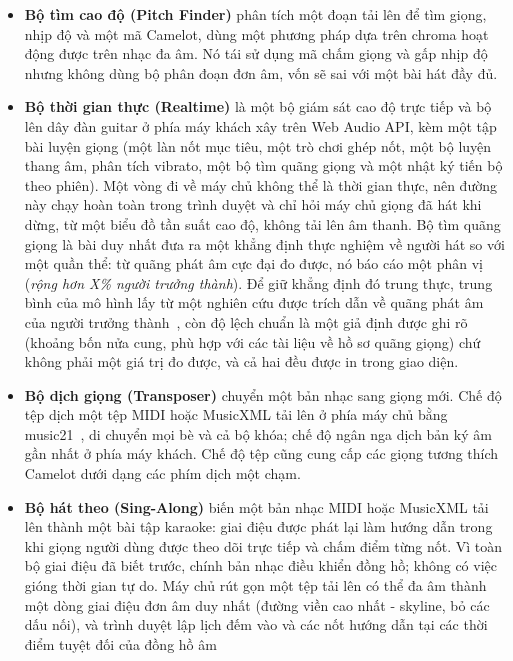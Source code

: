 \documentclass[12pt,a4paper]{article}
\begin{document}
\begin{itemize}
    \item \textbf{Bộ tìm cao độ (Pitch Finder)} phân tích một đoạn tải lên để tìm
    giọng, nhịp độ và một mã Camelot, dùng một phương pháp dựa trên chroma hoạt động
    được trên nhạc đa âm. Nó tái sử dụng mã chấm giọng và gấp nhịp độ nhưng không
    dùng bộ phân đoạn đơn âm, vốn sẽ sai với một bài hát đầy đủ.
    \item \textbf{Bộ thời gian thực (Realtime)} là một bộ giám sát cao độ trực tiếp
    và bộ lên dây đàn guitar ở phía máy khách xây trên Web Audio API, kèm một tập
    bài luyện giọng (một làn nốt mục tiêu, một trò chơi ghép nốt, một bộ luyện thang
    âm, phân tích vibrato, một bộ tìm quãng giọng và một nhật ký tiến bộ theo phiên).
    Một vòng đi về máy chủ không thể là thời gian thực, nên đường này chạy hoàn toàn
    trong trình duyệt và chỉ hỏi máy chủ giọng đã hát khi dừng, từ một biểu đồ tần
    suất cao độ, không tải lên âm thanh. Bộ tìm quãng giọng là bài duy nhất đưa ra
    một khẳng định thực nghiệm về người hát so với một quần thể: từ quãng phát âm cực
    đại đo được, nó báo cáo một phân vị (\emph{rộng hơn X\% người trưởng thành}). Để
    giữ khẳng định đó trung thực, trung bình của mô hình lấy từ một nghiên cứu được
    trích dẫn về quãng phát âm của người trưởng thành~\cite{hollien}, còn độ lệch
    chuẩn là một giả định được ghi rõ (khoảng bốn nửa cung, phù hợp với các tài liệu
    về hồ sơ quãng giọng) chứ không phải một giá trị đo được, và cả hai đều được in
    trong giao diện.
    \item \textbf{Bộ dịch giọng (Transposer)} chuyển một bản nhạc sang giọng mới.
    Chế độ tệp dịch một tệp MIDI hoặc MusicXML tải lên ở phía máy chủ bằng
    music21~\cite{music21}, di chuyển mọi bè và cả bộ khóa; chế độ ngân nga dịch bản
    ký âm gần nhất ở phía máy khách. Chế độ tệp cũng cung cấp các giọng tương thích
    Camelot dưới dạng các phím dịch một chạm.
    \item \textbf{Bộ hát theo (Sing-Along)} biến một bản nhạc MIDI hoặc MusicXML tải
    lên thành một bài tập karaoke: giai điệu được phát lại làm hướng dẫn trong khi
    giọng người dùng được theo dõi trực tiếp và chấm điểm từng nốt. Vì toàn bộ giai
    điệu đã biết trước, chính bản nhạc điều khiển đồng hồ; không có việc gióng thời
    gian tự do. Máy chủ rút gọn một tệp tải lên có thể đa âm thành một dòng giai điệu
    đơn âm duy nhất (đường viền cao nhất - skyline, bỏ các dấu nối), và trình duyệt
    lập lịch đếm vào và các nốt hướng dẫn tại các thời điểm tuyệt đối của đồng hồ âm

\end{itemize}
\end{document}
